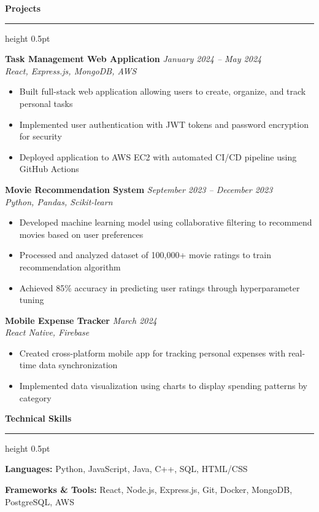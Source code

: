 \documentclass[11pt,letterpaper]{article}
\newcommand{\resumesection}[1]{
    \vspace{0.5em}
    {\color{accentcolor}\textbf{\large #1}}
    \vspace{0.15em}
    {\color{accentcolor}\hrule height 0.5pt}
    \vspace{0.3em}
}
\newcommand{\projectentry}[3]{
    \textbf{#1} \hfill \textit{#2} \\
    \textit{#3}
    \vspace{0.1em}
}
\begin{document}
\vspace{0.3em}

\resumesection{Projects}

\projectentry{Task Management Web Application}{January 2024 -- May 2024}{React, Express.js, MongoDB, AWS}
\begin{itemize}
    \item Built full-stack web application allowing users to create, organize, and track personal tasks
    \item Implemented user authentication with JWT tokens and password encryption for security
    \item Deployed application to AWS EC2 with automated CI/CD pipeline using GitHub Actions
\end{itemize}

\vspace{0.2em}

\projectentry{Movie Recommendation System}{September 2023 -- December 2023}{Python, Pandas, Scikit-learn}
\begin{itemize}
    \item Developed machine learning model using collaborative filtering to recommend movies based on user preferences
    \item Processed and analyzed dataset of 100,000+ movie ratings to train recommendation algorithm
    \item Achieved 85\% accuracy in predicting user ratings through hyperparameter tuning
\end{itemize}

\vspace{0.2em}

\projectentry{Mobile Expense Tracker}{March 2024}{React Native, Firebase}
\begin{itemize}
    \item Created cross-platform mobile app for tracking personal expenses with real-time data synchronization
    \item Implemented data visualization using charts to display spending patterns by category
\end{itemize}

\vspace{0.3em}

\resumesection{Technical Skills}

\textbf{Languages:} Python, JavaScript, Java, C++, SQL, HTML/CSS

\textbf{Frameworks \& Tools:} React, Node.js, Express.js, Git, Docker, MongoDB, PostgreSQL, AWS
\end{document}
